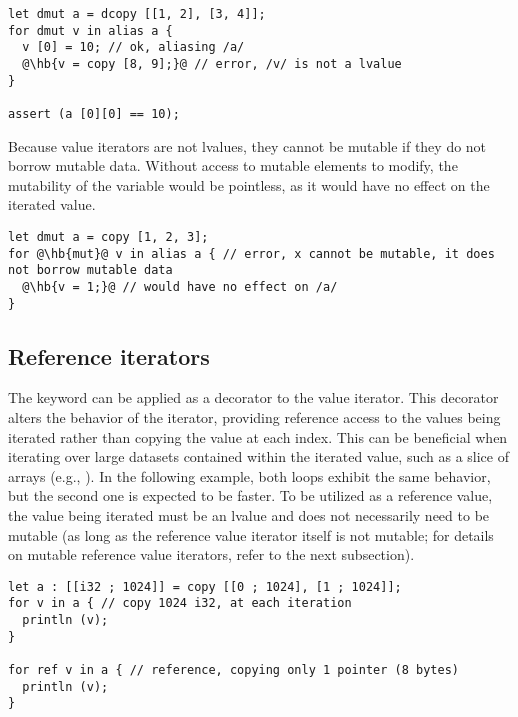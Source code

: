 \begin{lstlisting}[style=coloredverbatim, escapechar=@]
let dmut a = dcopy [[1, 2], [3, 4]];
for dmut v in alias a {
  v [0] = 10; // ok, aliasing /a/
  @\hb{v = copy [8, 9];}@ // error, /v/ is not a lvalue
}

assert (a [0][0] == 10);
\end{lstlisting}

Because value iterators are not lvalues, they cannot be mutable if they do not
borrow mutable data. Without access to mutable elements to modify, the
mutability of the variable would be pointless, as it would have no effect on the
iterated value.

\begin{lstlisting}[style=coloredverbatim, escapechar=@, caption=Useless mutable iterator, label=lst:useless_mut_iterator]
let dmut a = copy [1, 2, 3];
for @\hb{mut}@ v in alias a { // error, x cannot be mutable, it does not borrow mutable data
  @\hb{v = 1;}@ // would have no effect on /a/
}
\end{lstlisting}

\subsection{Reference iterators}

The  keyword can be applied as a decorator to the value iterator.
This decorator alters the behavior of the iterator, providing reference access
to the values being iterated rather than copying the value at each index. This
can be beneficial when iterating over large datasets contained within the
iterated value, such as a slice of arrays (e.g., \token{[[c8; 1024]]}). In the
following example, both loops exhibit the same behavior, but the second one is
expected to be faster. To be utilized as a reference value, the value being
iterated must be an lvalue and does not necessarily need to be mutable (as long
as the reference value iterator itself is not mutable; for details on mutable
reference value iterators, refer to the next subsection).

\begin{lstlisting}[style=coloredverbatim, escapechar=@]
let a : [[i32 ; 1024]] = copy [[0 ; 1024], [1 ; 1024]];
for v in a { // copy 1024 i32, at each iteration
  println (v);
}

for ref v in a { // reference, copying only 1 pointer (8 bytes)
  println (v);
}
\end{lstlisting}


